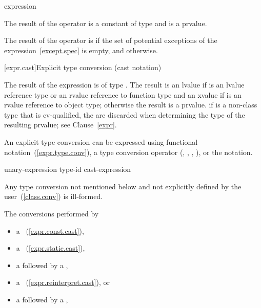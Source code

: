 \begin{bnf}
\br
   \terminal{(} expression \terminal{)}
\end{bnf}

\pnum
The result of the  operator is a constant of type 
and is a prvalue.

\pnum
The result of the  operator is  if
the set of potential exceptions of the expression~\ref{except.spec}
is empty, and  otherwise.%

[expr.cast]{Explicit type conversion (cast notation)}%

\pnum
The result of the expression   is
of type . The result is an lvalue if  is an lvalue
reference type or an rvalue reference to function type and an xvalue if 
is an rvalue reference to object type; otherwise the result is a prvalue.
\enternote 
if  is a non-class type that is cv-qualified, the
 are discarded when determining the type of the
resulting prvalue; see Clause~\ref{expr}.
\exitnote 

\pnum
An explicit type conversion can be expressed using functional
notation~(\ref{expr.type.conv}), a type conversion operator
(, , ,
), or the  notation.

\begin{bnf}
\br
    unary-expression\br
    \terminal{(} type-id \terminal{)} cast-expression
\end{bnf}

\pnum
Any type conversion not mentioned below and not explicitly defined by
the user~(\ref{class.conv}) is ill-formed.

\pnum
The conversions performed by

\begin{itemize}
%
%
%
\item a ~(\ref{expr.const.cast}),
\item a ~(\ref{expr.static.cast}),
\item a  followed by a ,
\item a ~(\ref{expr.reinterpret.cast}), or
\item a  followed by a ,
\end{itemize}


